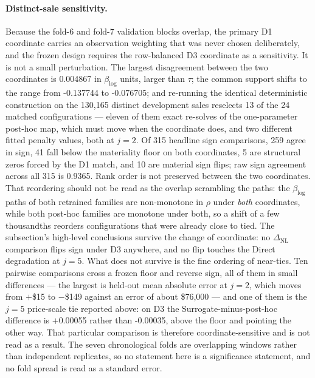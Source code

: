 \documentclass[10pt]{article}
\theoremstyle{definition}
\newcommand{\1}{\mathbf{1}}
\begin{document}
\paragraph{Distinct-sale sensitivity.}
Because the fold-6 and fold-7 validation blocks overlap, the primary D1 coordinate
carries an observation weighting that was never chosen deliberately, and the frozen design requires
the row-balanced D3 coordinate as a sensitivity. It is not a small perturbation. The largest
disagreement between the two coordinates is 0.004867 in $\beta_{\log}$ units, larger than
$\tau$; the common support shifts to the range from -0.137744 to -0.076705; and re-running the
identical deterministic construction on the 130,165 distinct development sales reselects
13 of the 24 matched configurations --- eleven of them exact re-solves of the one-parameter
post-hoc map, which must move when the coordinate does, and two different fitted penalty values,
both at $j=2$. Of 315 headline sign comparisons, 259 agree in sign, 41 fall below the materiality
floor on both coordinates, 5 are structural zeros forced by the D1 match, and 10 are material sign
flips; raw sign agreement across all 315 is 0.9365. Rank order is not
preserved between the two coordinates. That reordering should not be read as the overlap scrambling
the paths: the $\beta_{\log}$ paths of both retrained families are non-monotone in $\rho$ under
\emph{both} coordinates, while both post-hoc families are monotone under both, so a shift of a few
thousandths reorders configurations that were already close to tied. The subsection's high-level
conclusions survive the change of coordinate: no $\Delta_{\mathrm{NL}}$ comparison flips sign under
D3 anywhere, and no flip touches the Direct degradation at $j=5$. What does not survive is the fine
ordering of near-ties. Ten pairwise comparisons cross a frozen floor and reverse sign, all of them
in small differences --- the largest is held-out mean absolute error at $j=2$, which moves from
$+$\$15 to $-$\$149 against an error of about \$76,000 --- and one of them is the $j=5$
price-scale tie reported above: on D3 the Surrogate-minus-post-hoc difference is $+$0.00055 rather
than -0.00035, above the floor and pointing the other way. That particular comparison is therefore
coordinate-sensitive and is not read as a result. The seven chronological folds are overlapping
windows rather than independent
replicates, so no statement here is a significance statement, and no fold spread is read as a
standard error.
\end{document}
